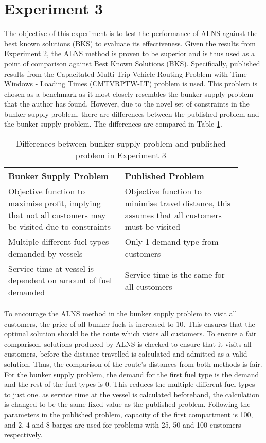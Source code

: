 \section{Experiment 3}
The objective of this experiment is to test the performance of ALNS against the best known solutions (BKS) \cite{yang_exact_2023} to evaluate its effectiveness. Given the results from Experiment 2, the ALNS method is proven to be superior and is thus used as a point of comparison against Best Known Solutions (BKS). Specifically, published results from the Capacitated Multi-Trip Vehicle Routing Problem with Time Windows - Loading Times (CMTVRPTW-LT) problem is used. This problem is chosen as a benchmark as it most closely resembles the bunker supply problem that the author has found. However, due to the novel set of constraints in the bunker supply problem, there are differences between the published problem and the bunker supply problem. The differences are compared in Table \ref{tab:Expt_3}.
\begin{table}[h]
    \centering
    \begin{tabular}{>{\raggedright}p{0.45\linewidth} p{0.45\linewidth}}
        \toprule
        \textbf{Bunker Supply Problem} & \textbf{Published Problem} \\ 
        \midrule
    
		Objective function to maximise profit, implying that not all customers may be visited due to constraints & Objective function to minimise travel distance, this assumes that all customers must be visited\\ \addlinespace
     
      Multiple different fuel types demanded by vessels & Only 1 demand type from customers\\ \addlinespace
      Service time at vessel is dependent on amount of fuel demanded & Service time is the same for all customers \\
        
    \bottomrule
    \end{tabular}
    \caption{Differences between bunker supply problem and published problem in Experiment 3}
    \label{tab:Expt_3}
\end{table} 

To encourage the ALNS method in the bunker supply problem to visit all customers, the price of all bunker fuels is increased to $10$. This ensures that the optimal solution should be the route which visits all customers. To ensure a fair comparison, solutions produced by ALNS is checked to ensure that it visits all customers, before the distance travelled is calculated and admitted as a valid solution. Thus, the comparison of the route's distances from both methods is fair. For the bunker supply problem, the demand for the first fuel type is the demand and the rest of the fuel types is 0. This reduces the multiple different fuel types to just one. as service time at the vessel is calculated beforehand, the calculation is changed to be the same fixed value as the published problem. Following the parameters in the published problem, capacity of the first compartment is 100, and 2, 4 and 8 barges are used for problems with 25, 50 and 100 customers respectively.

